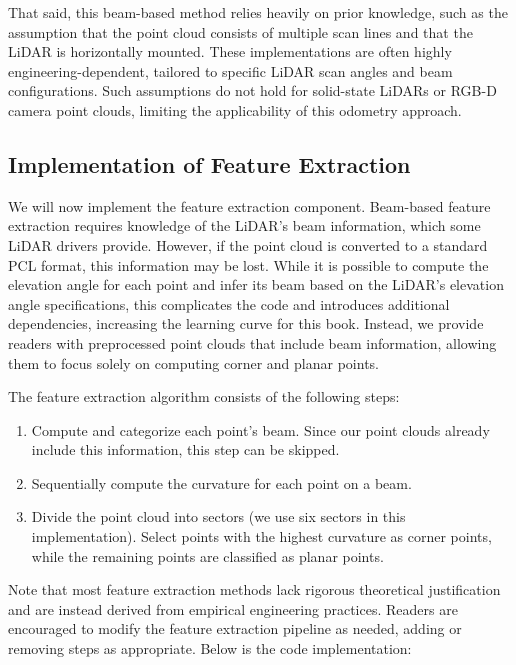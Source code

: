 That said, this beam-based method relies heavily on prior knowledge, such as the assumption that the point cloud consists of multiple scan lines and that the LiDAR is horizontally mounted. These implementations are often highly engineering-dependent, tailored to specific LiDAR scan angles and beam configurations. Such assumptions do not hold for solid-state LiDARs or RGB-D camera point clouds, limiting the applicability of this odometry approach.  

\subsection{Implementation of Feature Extraction}  

We will now implement the feature extraction component. Beam-based feature extraction requires knowledge of the LiDAR's beam information, which some LiDAR drivers provide. However, if the point cloud is converted to a standard PCL format, this information may be lost. While it is possible to compute the elevation angle for each point and infer its beam based on the LiDAR's elevation angle specifications, this complicates the code and introduces additional dependencies, increasing the learning curve for this book. Instead, we provide readers with preprocessed point clouds that include beam information, allowing them to focus solely on computing corner and planar points.  

The feature extraction algorithm consists of the following steps:  
\begin{enumerate}  
	\item Compute and categorize each point's beam. Since our point clouds already include this information, this step can be skipped.  
	\item Sequentially compute the curvature for each point on a beam.  
	\item Divide the point cloud into sectors (we use six sectors in this implementation). Select points with the highest curvature as corner points, while the remaining points are classified as planar points.  
\end{enumerate}  

Note that most feature extraction methods lack rigorous theoretical justification and are instead derived from empirical engineering practices. Readers are encouraged to modify the feature extraction pipeline as needed, adding or removing steps as appropriate. Below is the code implementation:  

